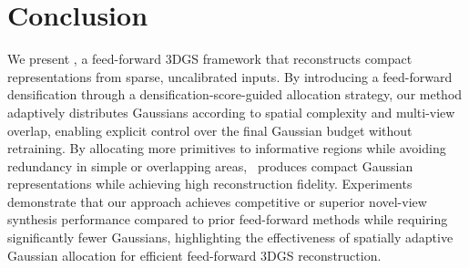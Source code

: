 \section{Conclusion}
\vspace{-6pt}
We present \OURMODEL, a feed-forward 3DGS framework that reconstructs compact representations from sparse, uncalibrated inputs. By introducing a feed-forward densification through a densification-score-guided allocation strategy, our method adaptively distributes Gaussians according to spatial complexity and multi-view overlap, enabling explicit control over the final Gaussian budget without retraining. By allocating more primitives to informative regions while avoiding redundancy in simple or overlapping areas, \OURMODEL\ produces compact Gaussian representations while achieving high reconstruction fidelity. Experiments demonstrate that our approach achieves competitive or superior novel-view synthesis performance compared to prior feed-forward methods while requiring significantly fewer Gaussians, highlighting the effectiveness of spatially adaptive Gaussian allocation for efficient feed-forward 3DGS reconstruction.